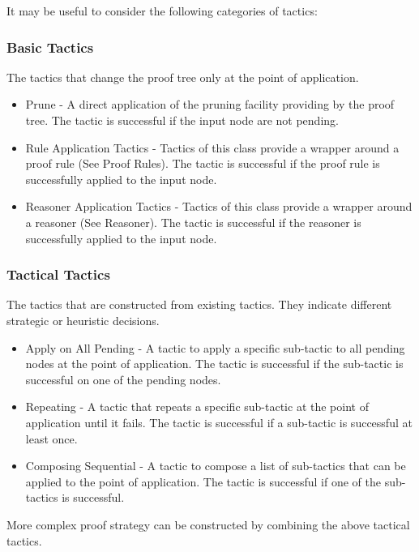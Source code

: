 It may be useful to consider the following categories of tactics:

\subsubsection{Basic Tactics}

The tactics that change the proof tree only at the point of application.

\begin{itemize}
	\item     Prune - A direct application of the pruning facility providing by the proof tree. The tactic is successful if the input node are not pending. 
	\item     Rule Application Tactics - Tactics of this class provide a wrapper around a proof rule (See Proof Rules). The tactic is successful if the proof rule is successfully applied to the input node. 

	\item     Reasoner Application Tactics - Tactics of this class provide a wrapper around a reasoner (See Reasoner). The tactic is successful if the reasoner is successfully applied to the input node. 
\end{itemize}

\subsubsection{Tactical Tactics}

The tactics that are constructed from existing tactics. They indicate different strategic or heuristic decisions.

\begin{itemize}
	\item         Apply on All Pending - A tactic to apply a specific sub-tactic to all pending nodes at the point of application. The tactic is successful if the sub-tactic is successful on one of the pending nodes. 
	\item         Repeating - A tactic that repeats a specific sub-tactic at the point of application until it fails. The tactic is successful if a sub-tactic is successful at least once. 
	\item         Composing Sequential - A tactic to compose a list of sub-tactics that can be applied to the point of application. The tactic is successful if one of the sub-tactics is successful. 
\end{itemize}

More complex proof strategy can be constructed by combining the above tactical tactics. 

